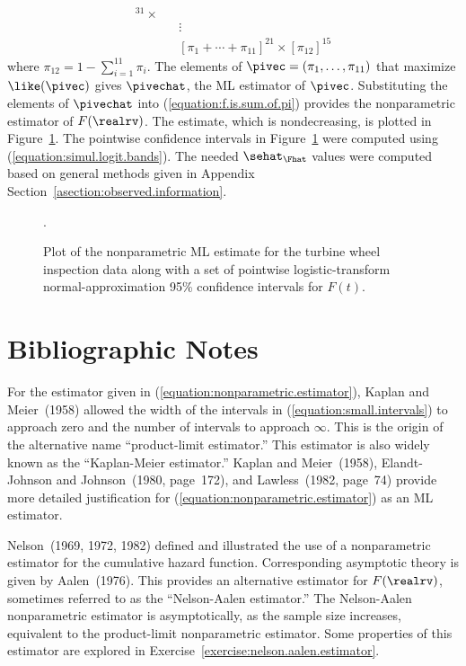 \begin{example}
\begin{eqnarray*}
	[ \pi_{4} + \cdots +\pi_{12}]^{31} \times  \\
&& \vdots\\
&&	[ \pi_{1}+\cdots +\pi_{11}]^{21} \times  
	[\pi_{12}]^{15}
\end{eqnarray*}
where $\pi_{12}=1-\sum_{i=1}^{11}\pi_{i}$.  The elements of $\pivec = (\pi_{1},
\ldots ,\pi_{11})$ that maximize $\like(\pivec)$ gives $\pivechat$, the
ML estimator of $\pivec$.  Substituting the elements of $\pivechat$
into (\ref{equation:f.is.sum.of.pi}) provides the nonparametric
estimator of $F(\realrv)$.  The estimate, which is nondecreasing, is
plotted in Figure~\ref{figure:turbine.cdf.pw.ps}. The pointwise
confidence intervals in Figure~\ref{figure:turbine.cdf.pw.ps} were
computed using (\ref{equation:simul.logit.bands}). The needed
$\sehat_{\Fhat}$ values were computed based on general methods given
in Appendix Section~\ref{asection:observed.information}.
\begin{figure}
\caption{Plot of the nonparametric ML estimate
for the turbine wheel inspection data along with a set of pointwise
logistic-transform normal-approximation 95\% confidence intervals for
$F(t)$.}
\label{figure:turbine.cdf.pw.ps}.
\end{figure}
\end{example}



\section*{Bibliographic Notes}

For the estimator given in (\ref{equation:nonparametric.estimator}),
Kaplan and Meier~(1958) allowed the width of the intervals in
(\ref{equation:small.intervals}) to approach zero and the number of
intervals to approach $\infty$.  This is the origin of the alternative
name ``product-limit estimator.''  This estimator is also widely known
as the ``Kaplan-Meier estimator.''  Kaplan and Meier~(1958),
Elandt-Johnson and Johnson~(1980, page~172), and Lawless~(1982,
page~74) provide more detailed justification for
(\ref{equation:nonparametric.estimator}) as an ML estimator.

Nelson~(1969, 1972, 1982) defined and illustrated the use of a
nonparametric estimator for the cumulative hazard function.
Corresponding asymptotic theory is given by Aalen~(1976).  This
provides an alternative estimator for $F(\realrv)$, sometimes referred
to as the ``Nelson-Aalen estimator.'' The Nelson-Aalen nonparametric
estimator is asymptotically, as the sample size increases, equivalent
to the product-limit nonparametric estimator.  Some properties of this
estimator are explored in Exercise~\ref{exercise:nelson.aalen.estimator}.

